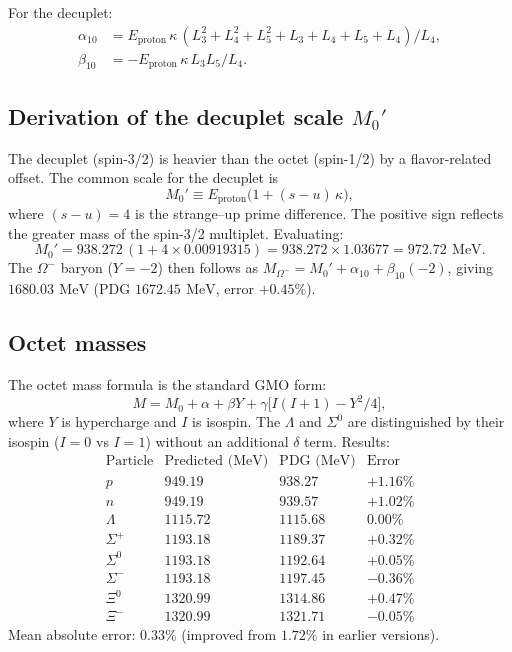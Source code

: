 \documentclass[aps,prd,reprint,twocolumn,showpacs,superscriptaddress]{revtex4-2}
\newcommand{\mev}{\,\text{MeV}}
\begin{document}
For the decuplet:
\begin{align}
\alpha_{10} &= E_{\text{proton}}\,\kappa\,(L_3^2 + L_4^2 + L_5^2 + L_3 + L_4 + L_5 + L_4)/L_4, \label{eq:alpha10} \\
\beta_{10} &= -E_{\text{proton}}\,\kappa\,L_3 L_5 / L_4. \label{eq:beta10}
\end{align}

\subsection{Derivation of the decuplet scale $M_0'$}

The decuplet (spin-3/2) is heavier than the octet (spin-1/2) by a
flavor-related offset.  The common scale for the decuplet is
\begin{equation}
M_0' \equiv E_{\text{proton}}\bigl(1 + (s-u)\,\kappa\bigr),
\label{eq:M0prime}
\end{equation}
where $(s-u) = 4$ is the strange--up prime difference.  The positive
sign reflects the greater mass of the spin-3/2 multiplet.  Evaluating:
\begin{equation}
M_0' = 938.272\,(1 + 4 \times 0.00919315)
     = 938.272 \times 1.03677
     = 972.72\ \mev.
\label{eq:M0prime_value}
\end{equation}
The $\Omega^-$ baryon ($Y=-2$) then follows as
$M_{\Omega^-} = M_0' + \alpha_{10} + \beta_{10}(-2)$, giving
$1680.03\ \mev$ (PDG $1672.45\ \mev$, error $+0.45\%$).

\subsection{Octet masses}

The octet mass formula is the standard GMO form:
\begin{equation}
M = M_0 + \alpha + \beta Y + \gamma\bigl[I(I+1) - Y^2/4\bigr],
\label{eq:gmo_octet}
\end{equation}
where $Y$ is hypercharge and $I$ is isospin.  The $\Lambda$ and
$\Sigma^0$ are distinguished by their isospin ($I=0$ vs $I=1$)
without an additional $\delta$ term.  Results:
\[
\begin{array}{lcccr}
\text{Particle} & \text{Predicted (MeV)} & \text{PDG (MeV)} & \text{Error} \\
p               & 949.19   & 938.27   & +1.16\% \\
n               & 949.19   & 939.57   & +1.02\% \\
\Lambda         & 1115.72  & 1115.68  & 0.00\% \\
\Sigma^+        & 1193.18  & 1189.37  & +0.32\% \\
\Sigma^0        & 1193.18  & 1192.64  & +0.05\% \\
\Sigma^-        & 1193.18  & 1197.45  & -0.36\% \\
\Xi^0           & 1320.99  & 1314.86  & +0.47\% \\
\Xi^-           & 1320.99  & 1321.71  & -0.05\%
\end{array}
\]
Mean absolute error: $0.33\%$ (improved from $1.72\%$ in earlier versions).
\end{document}

